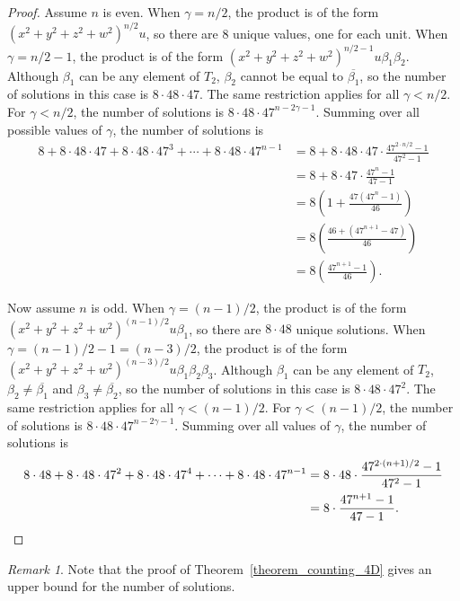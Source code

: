 \documentclass[12pt,table]{article}
\theoremstyle{definition}
\theoremstyle{remark}
\newtheorem{remark}[theorem]{Remark}
\numberwithin{equation}{section}
\newcommand{\myfrac}[2]{#1 / #2}
\begin{document}
\begin{proof}
Assume $ n $ is even.
When $ \gamma = \myfrac{n}{2} $, the product is of the form
$ (x^2 + y^2 + z^2 + w^2)^{\myfrac{n}{2}} u  $, so there are 8 unique values, one for
each unit.
When $ \gamma = \myfrac{n}{2} - 1 $, the product is of the form
$ (x^2 + y^2 + z^2 + w^2)^{\myfrac{n}{2} - 1} u \beta_1 \beta_2  $. Although $ \beta_1 $
can be any element of $ T_2 $, $ \beta_2 $ cannot be equal to $ \overline{ \beta_1 } $,
so the number of solutions in this case is $ 8 \cdot 48 \cdot 47 $. The same restriction
applies for all $ \gamma < \myfrac{n}{2} $. For $ \gamma < \myfrac{n}{2} $,
the number of
solutions is $ 8 \cdot 48 \cdot 47^{n - 2\gamma - 1} $.
Summing over all possible values of $ \gamma $, the number of solutions is
\begin{align*}
8 + 8 \cdot 48 \cdot 47 + 8 \cdot 48 \cdot 47^3 + \dotsb
+ 8 \cdot 48 \cdot 47^{n-1}
&= 8 + 8 \cdot 48 \cdot 47 \cdot \frac{47^{2 \cdot \myfrac{n}{2} } - 1 }{47^2 - 1}
\\
&= 8 + 8 \cdot 47 \cdot \frac{47^{n} - 1 }{47 - 1}
\\
&= 8 \left(1 +  \frac{47 (47^{n} - 1 ) }{46}\right)
\\
&= 8 \left( \frac{46 + (47^{n+1} - 47 ) }{46}\right)
\\
&= 8 \left( \frac{47^{n+1} -1 }{46}\right).
\end{align*}

Now assume $ n $ is odd.
When $ \gamma = \myfrac{(n-1)}{2} $, the product is of the form
$ (x^2 + y^2 + z^2 + w^2)^{\myfrac{(n-1)}{2}} u \beta_1  $, so there are $ 8 \cdot 48 $
unique solutions.
When $ \gamma = \myfrac{(n-1)}{2} - 1 = \myfrac{(n-3)}{2}  $, the product is of the form
$ (x^2 + y^2 + z^2 + w^2)^{\myfrac{(n-3)}{2}} u \beta_1 \beta_2 \beta_3  $. Although $ \beta_1 $
can be any element of $ T_2 $, $ \beta_2 \neq \overline{ \beta_1 } $
and $ \beta_3 \neq \overline{ \beta_2 } $,
so the number of solutions in this case is $ 8 \cdot 48 \cdot 47^2 $. The same restriction
applies for all $ \gamma < \myfrac{(n-1)}{2} $. For $ \gamma < \myfrac{(n-1)}{2} $,
the number of solutions is $ 8 \cdot 48 \cdot 47^{n - 2\gamma - 1 } $.
Summing over all values of $ \gamma $, the number of solutions is
\begin{align*}
8 \cdot 48 + 8 \cdot 48 \cdot 47^2 + 8 \cdot 48 \cdot 47^4 + \dotsb
+ 8 \cdot 48 \cdot 47^{n-1}
&= 8 \cdot 48 \cdot \frac{47^{2 \cdot \myfrac{(n+1)}{2} } - 1 }{47^2 - 1}
\\
&= 8  \cdot \frac{47^{n+1} - 1 }{47 - 1}. \qedhere
\end{align*}
\end{proof}
\begin{remark}
Note that the proof of Theorem~\ref{theorem_counting_4D}
gives an upper bound for the number of solutions.
\end{remark}
\end{document}
